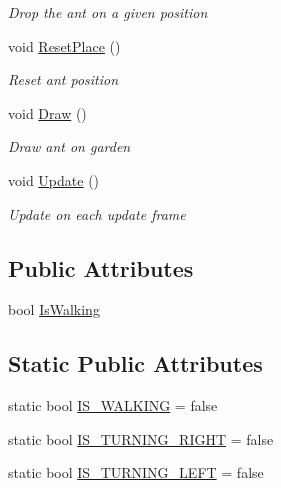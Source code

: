 \begin{DoxyCompactItemize}
\begin{DoxyCompactList}\small\item\em Drop the ant on a given position \end{DoxyCompactList}\item 
void \mbox{\hyperlink{class_krop_1_1_krohonde_1_1_ant_a2693a758e9442697b917355188026cdc}{Reset\+Place}} ()
\begin{DoxyCompactList}\small\item\em Reset ant position \end{DoxyCompactList}\item 
void \mbox{\hyperlink{class_krop_1_1_krohonde_1_1_ant_a42f7a3125e5224dcd012eaa72cfd8fe9}{Draw}} ()
\begin{DoxyCompactList}\small\item\em Draw ant on garden \end{DoxyCompactList}\item 
void \mbox{\hyperlink{class_krop_1_1_krohonde_1_1_ant_ab9f52b29953c9b11ac6b4d53b670fa29}{Update}} ()
\begin{DoxyCompactList}\small\item\em Update on each update frame \end{DoxyCompactList}\end{DoxyCompactItemize}
\subsection*{Public Attributes}
\begin{DoxyCompactItemize}
\item 
bool \mbox{\hyperlink{class_krop_1_1_krohonde_1_1_ant_aac638d420bbab1f1b1bf95ffdac9479a}{Is\+Walking}}
\end{DoxyCompactItemize}
\subsection*{Static Public Attributes}
\begin{DoxyCompactItemize}
\item 
static bool \mbox{\hyperlink{class_krop_1_1_krohonde_1_1_ant_a1e60fa8052261eea263d6a9ad8da55a5}{I\+S\+\_\+\+W\+A\+L\+K\+I\+NG}} = false
\item 
static bool \mbox{\hyperlink{class_krop_1_1_krohonde_1_1_ant_a19b23b4e5181337a65ec628f0f0f9b1b}{I\+S\+\_\+\+T\+U\+R\+N\+I\+N\+G\+\_\+\+R\+I\+G\+HT}} = false
\item 
static bool \mbox{\hyperlink{class_krop_1_1_krohonde_1_1_ant_a417cf72677f5032d5c19d63e73987520}{I\+S\+\_\+\+T\+U\+R\+N\+I\+N\+G\+\_\+\+L\+E\+FT}} = false
\end{DoxyCompactItemize}


